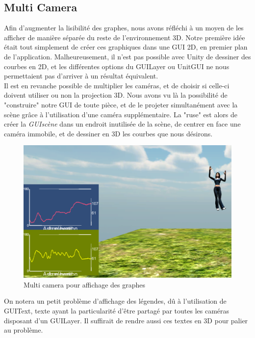 \subsection{Multi Camera}
Afin d'augmenter la lisibilité des graphes, nous avons réfléchi à un moyen de les afficher de manière séparée du reste de
l'environnement 3D. Notre première idée était tout simplement de créer ces graphiques dans une GUI 2D, en premier
plan de l'application. Malheureusement, il n'est pas possible avec Unity de dessiner des courbes en 2D, et les différentes
options du GUILayer ou UnitGUI ne nous permettaient pas d'arriver à un résultat équivalent.\\
Il est en revanche possible de multiplier les caméras, et de choisir si celle-ci doivent utiliser ou non la projection 3D. Nous 
avons vu là la possibilité de "construire" notre GUI de toute pièce, et de le projeter simultanément avec la scène grâce à
l'utilisation d'une caméra supplémentaire. La "ruse" est alors de créer la  \textit{GUIscène} dans un endroit inutilisée de la 
scène, de centrer en face une caméra immobile, et de dessiner en 3D les courbes que nous désirons.
\begin{figure}
\begin{center}
  \includegraphics[scale=0.6]{../images/multicamera.png} \caption{Multi camera pour affichage des graphes}
  \end{center}
\end{figure}
 On notera un petit problème d'affichage des légendes, dû à l'utilisation de GUIText, texte ayant la particularité d'être partagé par toutes les 
caméras disposant d'un GUILayer. Il suffirait de rendre aussi ces textes en 3D pour palier au problème.

